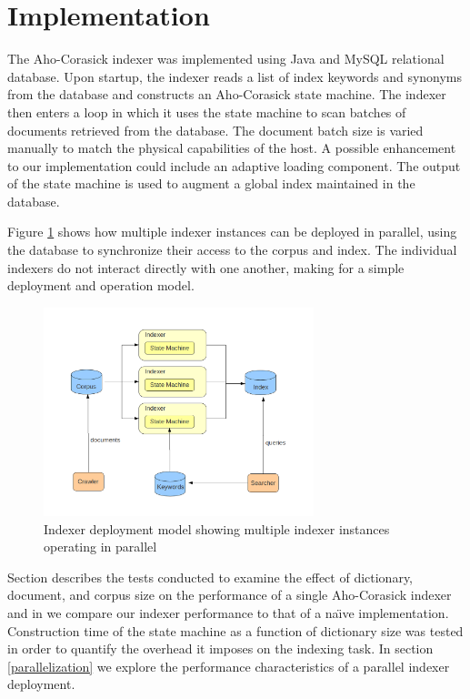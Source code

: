 \documentclass[10pt]{article}
\begin{document}
\section{Implementation}
\label{sec:implementation}
The Aho-Corasick indexer was implemented using Java and MySQL
relational database. Upon startup, the indexer reads a list of index
keywords and synonyms from the database and constructs an Aho-Corasick
state machine. The indexer then enters a loop in which it uses the
state machine to scan batches of documents retrieved from the
database. The document batch size is varied manually to match the
physical capabilities of the host. A possible enhancement to our
implementation could include an adaptive loading component. The output
of the state machine is used to augment a global index maintained in
the database.

Figure \ref{fig:deploymentmodel} shows how multiple indexer instances
can be deployed in parallel, using the database to synchronize their
access to the corpus and index. The individual indexers do not
interact directly with one another, making for a simple deployment and
operation model.


\begin{figure}
  \begin{center}
        \includegraphics[width=0.70\textwidth,height=!]{deploymentmodel}
  \end{center}
  \caption{Indexer deployment model showing multiple indexer instances
  operating in parallel}
  \label{fig:deploymentmodel}
\end{figure} 

Section \label{sec:experimentresults} describes the tests conducted to
examine the effect of dictionary, document, and corpus size on the
performance of a single Aho-Corasick indexer and in \label{sec:naive}
we compare our indexer performance to that of a na\"{\i}ve
implementation. Construction time of the state machine as a function
of dictionary size was tested in order to quantify the overhead it
imposes on the indexing task. In section \ref{parallelization} we
explore the performance characteristics of a parallel indexer
deployment.
\end{document}
